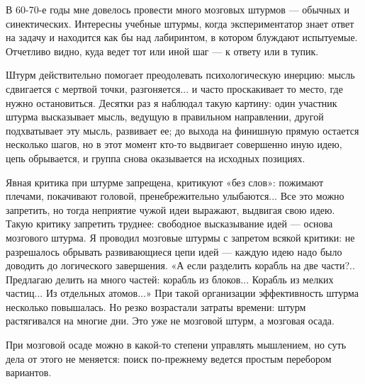 В 60-70-е годы мне довелось  провести много мозговых штурмов — обычных
и синектических. Интересны учебные штурмы, когда экспериментатор знает
ответ на задачу и находится как  бы над лабиринтом, в котором блуждают
испытуемые. Отчетливо  видно, куда ведет тот  или иной шаг —  к ответу
или в тупик.

Штурм  действительно  помогает преодолевать  психологическую  инерцию:
мысль сдвигается с мертвой  точки, разгоняется... и часто проскакивает
то  место,  где  нужно  остановиться. Десятки  раз  я  наблюдал  такую
картину: один участник штурма  высказывает мысль, ведущую в правильном
направлении, другой подхватывает эту мысль, развивает ее; до выхода на
финишную  прямую остается  несколько шагов,  но в  этот момент  кто-то
выдвигает  совершенно  иную  идею,  цепь обрывается,  и  группа  снова
оказывается на исходных позициях.

Явная  критика при  штурме запрещена,  критикуют «без  слов»: пожимают
плечами,  покачивают головой,  пренебрежительно  улыбаются... Все  это
можно запретить, но тогда неприятие чужой идеи выражают, выдвигая свою
идею. Такую  критику запретить труднее: свободное  высказывание идей —
основа мозгового штурма. Я проводил  мозговые штурмы с запретом всякой
критики: не разрешалось обрывать развивающиеся цепи идей — каждую идею
надо  было  доводить  до  логического завершения.  «А  если  разделить
корабль на две  части?.. Предлагаю делить на много  частей: корабль из
блоков...  Корабль из  мелких  частиц... Из  отдельных атомов...»  При
такой организации эффективность штурма  несколько повышалась. Но резко
возрастали затраты времени: штурм растягивался  на многие дни. Это уже
не мозговой штурм, а мозговая осада.

При мозговой  осаде можно в  какой-то степени управлять  мышлением, но
суть  дела от  этого не  меняется: поиск  по-прежнему ведется  простым
перебором вариантов.

